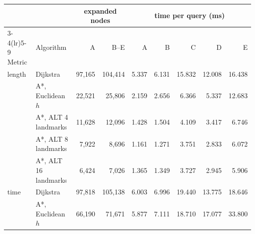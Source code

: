 \begin{tabular}{ll rr rrrrr}
\toprule
 & & \multicolumn{2}{c}{expanded nodes} & \multicolumn{5}{c}{time per query (ms)} \\
\cmidrule(lr){3-4}\cmidrule(lr){5-9}
Metric & Algorithm & A & B--E & A & B & C & D & E \\
\midrule
length & Dijkstra & 97{,}165 & 104{,}414 & 5.337 & 6.131 & 15.832 & 12.008 & 16.438 \\
 & A*{,} Euclidean $h$ & 22{,}521 & 25{,}806 & 2.159 & 2.656 & 6.366 & 5.337 & 12.683 \\
 & A*{,} ALT 4 landmarks & 11{,}628 & 12{,}096 & 1.428 & 1.504 & 4.109 & 3.417 & 6.746 \\
 & A*{,} ALT 8 landmarks & 7{,}922 & 8{,}696 & 1.161 & 1.271 & 3.751 & 2.833 & 6.072 \\
 & A*{,} ALT 16 landmarks & 6{,}424 & 7{,}026 & 1.365 & 1.349 & 3.727 & 2.945 & 5.906 \\
\midrule
time & Dijkstra & 97{,}818 & 105{,}138 & 6.003 & 6.996 & 19.440 & 13.775 & 18.646 \\
 & A*{,} Euclidean $h$ & 66{,}190 & 71{,}671 & 5.877 & 7.111 & 18.710 & 17.077 & 33.800 \\
\bottomrule
\end{tabular}
